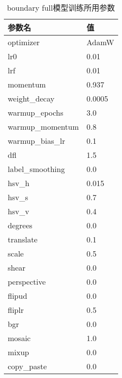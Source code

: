  
  \begin{table}
    \centering
  \begin{tabular}{ll}\toprule
     参数名&值\\\midrule
     optimizer&AdamW\\
     lr0& 0.01\\
  lrf& 0.01\\
  momentum& 0.937\\
  weight\_decay& 0.0005\\
  warmup\_epochs& 3.0\\
  warmup\_momentum& 0.8\\
  warmup\_bias\_lr& 0.1\\
  dfl& 1.5\\
  label\_smoothing& 0.0\\

  hsv\_h& 0.015\\
  hsv\_s& 0.7\\
  hsv\_v& 0.4\\
  degrees& 0.0\\
  translate& 0.1\\
  scale& 0.5\\
  shear& 0.0\\
  perspective& 0.0\\
  flipud& 0.0\\
  fliplr& 0.5\\
  bgr& 0.0\\
  mosaic& 1.0\\
  mixup& 0.0\\
  copy\_paste& 0.0\\
     \bottomrule
    \end{tabular}
    \caption{boundary full模型训练所用参数}
    \end{table}

